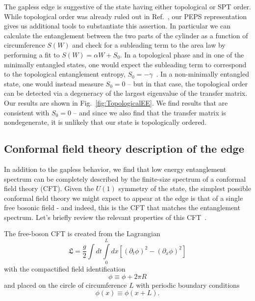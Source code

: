 The gapless edge is suggestive of the state having either topological or SPT order.
While topological order was already ruled out in Ref.~\cite{kimchi2013}, our PEPS
representation gives us additional tools to substantiate this assertion. In particular
we can calculate the entanglement between the two parts of the cylinder as a function
of circumference $S(W)$ and check for a subleading term to the area law by performing
a fit to $S(W) = \alpha W + S_0$. In a topological phase and in one of the minimally entangled
states, one would expect the subleading term to correspond to the topological entanglement
entropy, $S_0 = -\gamma$~\cite{kitaev2006, levin2006, jiang2012}.
In a non-minimally entangled state, one would instead measure $S_0 = 0$
-- but in that case, the topological order can be detected via a degeneracy of
 the largest eigenvalue of the transfer matrix.
Our results are shown in Fig.~\ref{fig:TopologicalEE}. We find results that are consistent
with $S_0 = 0$ -- and since we also find that the transfer matrix is nondegenerate,
it is unlikely that our state is topologically ordered.

\subsection{Conformal field theory description of the edge}
\label{sec:CFT}

In addition to the gapless behavior, we find that low energy entanglement spectrum
can be completely described by the finite-size spectrum of a conformal field theory (CFT). 
Given the $U(1)$ symmetry of the state, the simplest possible
conformal field theory we might expect to appear at the edge is that
of a single free bosonic field - and indeed, this is the CFT that matches the 
entanglement spectrum.
Let's briefly review the relevant properties of this CFT~\cite{difrancesco}.

The free-boson CFT is created from the Lagrangian
\begin{equation}
\mathfrak{L} = \frac{g}{2}\int dt \int\limits_0^L dx \left[ (\partial_t \phi)^2 - (\partial_x \phi)^2 \right]
\end{equation}
with the compactified field identification
\begin{equation*}
\phi \equiv \phi + 2\pi R
\end{equation*}
and placed on the circle of circumference $L$ with periodic boundary conditions
\begin{equation*}
\phi(x) \equiv \phi(x+L).
\end{equation*}

